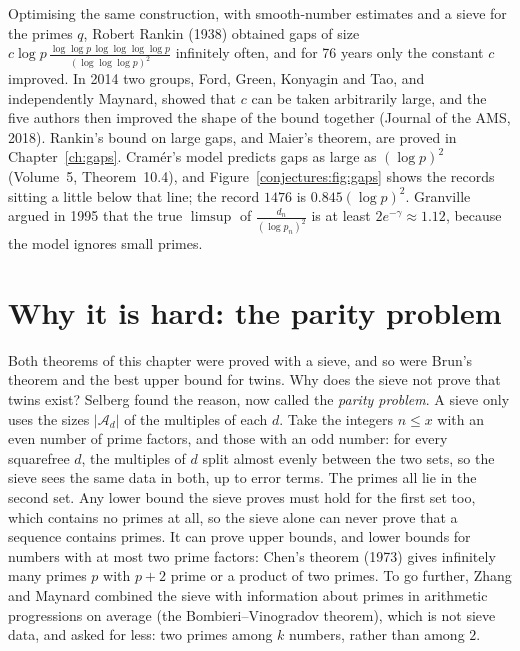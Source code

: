 \begin{remark}
Optimising the same construction, with smooth-number estimates and a sieve for the primes $q$, Robert Rankin (1938) obtained gaps of size
$c\log p\,\frac{\log\log p\,\log\log\log\log p}{(\log\log\log p)^2}$ infinitely often, and for 76 years only the constant $c$ improved. In 2014 two groups,
Ford, Green, Konyagin and Tao, and independently Maynard, showed that $c$ can be taken arbitrarily large, and the five authors then improved the
shape of the bound together (Journal of the AMS, 2018). Rankin's bound on large gaps, and Maier's theorem, are proved in Chapter~\ref{ch:gaps}. Cram\'er's model predicts gaps as large as $(\log p)^2$ (Volume~5, Theorem~10.4), and
Figure~\ref{conjectures:fig:gaps} shows the records sitting a little below that line; the record $1476$ is $0.845(\log p)^2$. Granville argued in 1995 that the
true $\limsup$ of $\frac{d_n}{(\log p_n)^2}$ is at least $2e^{-\gamma}\approx1.12$, because the model ignores small primes.
\end{remark}

\section{Why it is hard: the parity problem}

Both theorems of this chapter were proved with a sieve, and so were Brun's theorem and the best upper bound for twins. Why does the sieve not prove
that twins exist? Selberg found the reason, now called the \emph{parity problem}. A sieve only uses the sizes $|\mathcal A_d|$ of the multiples of each
$d$. Take the integers $n\le x$ with an even number of prime factors, and those with an odd number: for every squarefree $d$, the multiples of $d$ split
almost evenly between the two sets, so the sieve sees the same data in both, up to error terms. The primes all lie in the second set. Any lower bound
the sieve proves must hold for the first set too, which contains no primes at all, so the sieve alone can never prove that a sequence contains primes.
It can prove upper bounds, and lower bounds for numbers with at most two prime factors: Chen's theorem (1973) gives infinitely many primes $p$ with
$p+2$ prime or a product of two primes. To go further, Zhang and Maynard combined the sieve with information about primes in arithmetic progressions
on average (the Bombieri--\allowbreak Vinogradov theorem), which is not sieve data, and asked for less: two primes among $k$ numbers, rather than among $2$.

